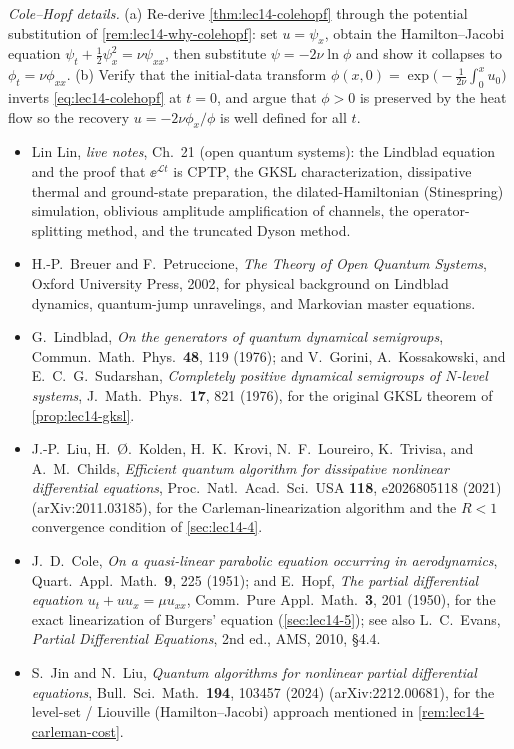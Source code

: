 \begin{exercise}\label{ex:lec14-7}
\emph{Cole--Hopf details.} (a) Re-derive \cref{thm:lec14-colehopf} through the potential
substitution of \cref{rem:lec14-why-colehopf}: set $u=\psi_x$, obtain the Hamilton--Jacobi
equation $\psi_t+\tfrac12\psi_x^2=\nu\psi_{xx}$, then substitute $\psi=-2\nu\ln\phi$ and show it
collapses to $\phi_t=\nu\phi_{xx}$. (b) Verify that the initial-data transform $\phi(x,0)=
\exp\bigl(-\tfrac1{2\nu}\int_0^x u_0\bigr)$ inverts \eqref{eq:lec14-colehopf} at $t=0$, and argue
that $\phi>0$ is preserved by the heat flow so the recovery $u=-2\nu\phi_x/\phi$ is well defined
for all $t$.
\end{exercise}

\readingsection
\begin{itemize}[leftmargin=1.4em]
  \item Lin Lin, \emph{live notes}, Ch.~21 (open quantum systems): the Lindblad equation and the
        proof that $\ee^{\mathcal L t}$ is CPTP, the GKSL characterization, dissipative thermal
        and ground-state preparation, the dilated-Hamiltonian (Stinespring) simulation, oblivious
        amplitude amplification of channels, the operator-splitting method, and the truncated
        Dyson method.
  \item H.-P.~Breuer and F.~Petruccione, \emph{The Theory of Open Quantum Systems}, Oxford
        University Press, 2002, for physical background on Lindblad dynamics, quantum-jump
        unravelings, and Markovian master equations.
  \item G.~Lindblad, \emph{On the generators of quantum dynamical semigroups}, Commun.\ Math.\
        Phys.\ \textbf{48}, 119 (1976); and V.~Gorini, A.~Kossakowski, and E.~C.~G.~Sudarshan,
        \emph{Completely positive dynamical semigroups of $N$-level systems}, J.\ Math.\ Phys.\
        \textbf{17}, 821 (1976), for the original GKSL theorem of \cref{prop:lec14-gksl}.
  \item J.-P.~Liu, H.~\O.~Kolden, H.~K.~Krovi, N.~F.~Loureiro, K.~Trivisa, and A.~M.~Childs,
        \emph{Efficient quantum algorithm for dissipative nonlinear differential equations}, Proc.\
        Natl.\ Acad.\ Sci.\ USA \textbf{118}, e2026805118 (2021) (arXiv:2011.03185), for the
        Carleman-linearization algorithm and the $R<1$ convergence condition of
        \cref{sec:lec14-4}.
  \item J.~D.~Cole, \emph{On a quasi-linear parabolic equation occurring in aerodynamics}, Quart.\
        Appl.\ Math.\ \textbf{9}, 225 (1951); and E.~Hopf, \emph{The partial differential equation
        $u_t+uu_x=\mu u_{xx}$}, Comm.\ Pure Appl.\ Math.\ \textbf{3}, 201 (1950), for the exact
        linearization of Burgers' equation (\cref{sec:lec14-5}); see also L.~C.~Evans,
        \emph{Partial Differential Equations}, 2nd ed., AMS, 2010, \S4.4.
  \item S.~Jin and N.~Liu, \emph{Quantum algorithms for nonlinear partial differential equations},
        Bull.\ Sci.\ Math.\ \textbf{194}, 103457 (2024) (arXiv:2212.00681), for the level-set /
        Liouville (Hamilton--Jacobi) approach mentioned in \cref{rem:lec14-carleman-cost}.
\end{itemize}
